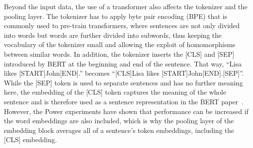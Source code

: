 Beyond the input data, the use of a transformer also affects the tokenizer and the pooling layer. The tokenizer has to apply byte pair encoding (BPE) that is commonly used to pre-train transformers, where sentences are not only divided into words but words are further divided into subwords, thus keeping the vocabulary of the tokenizer small and allowing the exploit of homomorphisms between similar words. In addition, the tokenizer inserts the [CLS] and [SEP] introduced by BERT at the beginning and end of the sentence. That way, ``Lisa likes [START]John[END].'' becomes ``[CLS]Lisa likes [START]John[END].[SEP]''. While the [SEP] token is used to separate sentences and has no further meaning here, the embedding of the [CLS] token captures the meaning of the whole sentence and is therefore used as a sentence representation in the BERT paper~\cite{Devlin2019BERTPO}. However, the Power experiments have shown that performance can be increased if the word embeddings are also included, which is why the pooling layer of the embedding block averages all of a sentence's token embeddings, including the [CLS] embedding.
